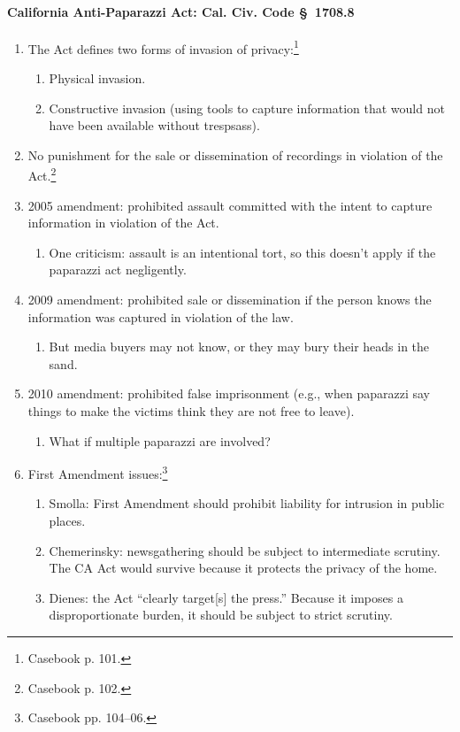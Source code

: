 \paragraph{California Anti-Paparazzi Act: Cal. Civ. Code \S\ 1708.8}

\begin{enumerate}
    \item The Act defines two forms of invasion of privacy:\footnote{Casebook p. 
    101.}
    \begin{enumerate}
        \item Physical invasion.
        \item Constructive invasion (using tools to capture information that 
        would not have been available without trespsass).
    \end{enumerate}
    \item No punishment for the sale or dissemination of recordings in violation 
    of the Act.\footnote{Casebook p. 102.}
    \item 2005 amendment: prohibited assault committed with the intent to 
    capture information in violation of the Act.
    \begin{enumerate}
        \item One criticism: assault is an intentional tort, so this doesn't 
        apply if the paparazzi act negligently.
    \end{enumerate}
    \item 2009 amendment: prohibited sale or dissemination if the person knows 
    the information was captured in violation of the law.
    \begin{enumerate}
        \item But media buyers may not know, or they may bury their heads in the 
        sand.
    \end{enumerate}
    \item 2010 amendment: prohibited false imprisonment (e.g., when paparazzi 
    say things to make the victims think they are not free to leave).
    \begin{enumerate}
        \item What if multiple paparazzi are involved?
    \end{enumerate}
    \item First Amendment issues:\footnote{Casebook pp. 104--06.}
    \begin{enumerate}
        \item Smolla: First Amendment should prohibit liability for intrusion in 
        public places.
        \item Chemerinsky: newsgathering should be subject to intermediate 
        scrutiny. The CA Act would survive because it protects the privacy of 
        the home.
        \item Dienes: the Act ``clearly target[s] the press.'' Because it 
        imposes a disproportionate burden, it should be subject to strict 
        scrutiny.
    \end{enumerate}
\end{enumerate}

